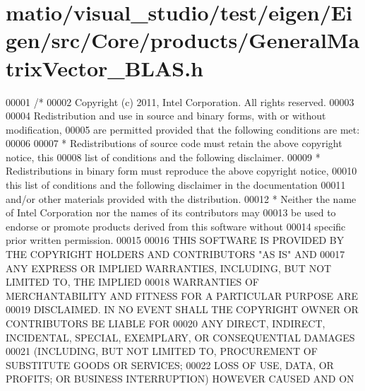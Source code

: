 \hypertarget{matio_2visual__studio_2test_2eigen_2_eigen_2src_2_core_2products_2_general_matrix_vector___b_l_a_s_8h_source}{}\section{matio/visual\+\_\+studio/test/eigen/\+Eigen/src/\+Core/products/\+General\+Matrix\+Vector\+\_\+\+B\+L\+AS.h}
\label{matio_2visual__studio_2test_2eigen_2_eigen_2src_2_core_2products_2_general_matrix_vector___b_l_a_s_8h_source}

\begin{DoxyCode}
00001 \textcolor{comment}{/*}
00002 \textcolor{comment}{ Copyright (c) 2011, Intel Corporation. All rights reserved.}
00003 \textcolor{comment}{}
00004 \textcolor{comment}{ Redistribution and use in source and binary forms, with or without modification,}
00005 \textcolor{comment}{ are permitted provided that the following conditions are met:}
00006 \textcolor{comment}{}
00007 \textcolor{comment}{ * Redistributions of source code must retain the above copyright notice, this}
00008 \textcolor{comment}{   list of conditions and the following disclaimer.}
00009 \textcolor{comment}{ * Redistributions in binary form must reproduce the above copyright notice,}
00010 \textcolor{comment}{   this list of conditions and the following disclaimer in the documentation}
00011 \textcolor{comment}{   and/or other materials provided with the distribution.}
00012 \textcolor{comment}{ * Neither the name of Intel Corporation nor the names of its contributors may}
00013 \textcolor{comment}{   be used to endorse or promote products derived from this software without}
00014 \textcolor{comment}{   specific prior written permission.}
00015 \textcolor{comment}{}
00016 \textcolor{comment}{ THIS SOFTWARE IS PROVIDED BY THE COPYRIGHT HOLDERS AND CONTRIBUTORS "AS IS" AND}
00017 \textcolor{comment}{ ANY EXPRESS OR IMPLIED WARRANTIES, INCLUDING, BUT NOT LIMITED TO, THE IMPLIED}
00018 \textcolor{comment}{ WARRANTIES OF MERCHANTABILITY AND FITNESS FOR A PARTICULAR PURPOSE ARE}
00019 \textcolor{comment}{ DISCLAIMED. IN NO EVENT SHALL THE COPYRIGHT OWNER OR CONTRIBUTORS BE LIABLE FOR}
00020 \textcolor{comment}{ ANY DIRECT, INDIRECT, INCIDENTAL, SPECIAL, EXEMPLARY, OR CONSEQUENTIAL DAMAGES}
00021 \textcolor{comment}{ (INCLUDING, BUT NOT LIMITED TO, PROCUREMENT OF SUBSTITUTE GOODS OR SERVICES;}
00022 \textcolor{comment}{ LOSS OF USE, DATA, OR PROFITS; OR BUSINESS INTERRUPTION) HOWEVER CAUSED AND ON}

\end{DoxyCode}
